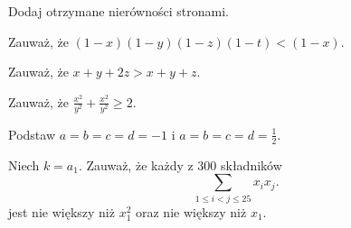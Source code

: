 
\begin{hints_list}
	\item Dodaj otrzymane nierówności stronami.
	\item Zauważ, że $(1 - x)(1 - y)(1 - z)(1 - t) < (1 - x)$.
	\item Zauważ, że $x + y + 2z > x + y + z$.
	\item Zauważ, że $\frac{x^2}{y^2} + \frac{x^2}{y^2} \geqslant 2$.
	\item Podstaw $a = b = c = d = -1$ i $a = b = c = d = \frac{1}{2}$.
	\item Niech $k = a_1$. Zauważ, że każdy z $300$ składników
	\[
		\sum_{1 \leqslant i < j \leqslant 25} x_ix_j.
	\]
	jest nie większy niż $x_1^2$ oraz nie większy niż $x_1$.
\end{hints_list}